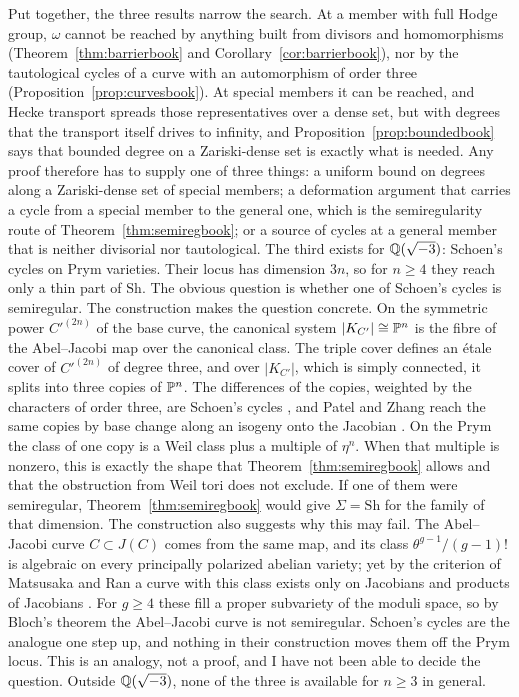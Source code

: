Put together, the three results narrow the search. At a member with full
Hodge group, $\omega$ cannot be reached by anything built from divisors and
homomorphisms (Theorem~\ref{thm:barrierbook} and
Corollary~\ref{cor:barrierbook}), nor by the tautological cycles of a curve
with an automorphism of order three (Proposition~\ref{prop:curvesbook}). At
special members it can be reached, and Hecke transport spreads those
representatives over a dense set, but with degrees that the transport
itself drives to infinity, and Proposition~\ref{prop:boundedbook} says that
bounded degree on a Zariski-dense set is exactly what is needed. Any proof
therefore has to supply one of three things: a uniform bound on degrees
along a Zariski-dense set of special members; a deformation argument that
carries a cycle from a special member to the general one, which is the
semiregularity route of Theorem~\ref{thm:semiregbook}; or a source of cycles at
a general member that is neither divisorial nor tautological. The third
exists for $\mathbb{Q}(\sqrt{-3})$: Schoen's cycles on Prym varieties. Their
locus has dimension $3n$, so for $n\ge4$ they reach only a thin part of
$\mathrm{Sh}$. The obvious question is whether one of Schoen's cycles is
semiregular. The construction makes the question concrete. On the
symmetric power $C'^{(2n)}$ of the base curve, the canonical system
$|K_{C'}|\cong\mathbb{P}^{n}$ is the fibre of the Abel--Jacobi map over the
canonical class. The triple cover defines an \'etale cover of $C'^{(2n)}$
of degree three, and over $|K_{C'}|$, which is simply connected, it splits
into three copies of $\mathbb{P}^{n}$. The differences of the copies, weighted by
the characters of order three, are Schoen's cycles
\cite[Theorem~2.0 with $r=0$]{Sch88}, and Patel and Zhang reach the same
copies by base change along an isogeny onto the Jacobian
\cite[Theorem~1.1]{PZ25}. On the Prym the class of one copy is a Weil
class plus a multiple of $\eta^{n}$. When
that multiple is nonzero, this is exactly the shape that Theorem~\ref{thm:semiregbook}
allows and that the obstruction from Weil tori does not exclude. If one of them were
semiregular, Theorem~\ref{thm:semiregbook} would give $\Sigma=\mathrm{Sh}$ for the
family of that dimension. The construction also suggests why this may
fail. The Abel--Jacobi curve $C\subset J(C)$ comes from the same map, and
its class $\theta^{g-1}/(g-1)!$ is algebraic on every principally polarized
abelian variety; yet by the criterion of Matsusaka and Ran a curve with this
class exists only on Jacobians and products of Jacobians
\cite{Mat59,Ran81}. For $g\ge4$ these fill a proper subvariety of the
moduli space, so by Bloch's theorem the Abel--Jacobi curve is not
semiregular. Schoen's cycles are the analogue one step up, and nothing in
their construction moves them off the Prym locus. This is an analogy, not a
proof, and I have not been able to decide the question. Outside
$\mathbb{Q}(\sqrt{-3})$, none of the three is available for $n\ge3$ in general.

